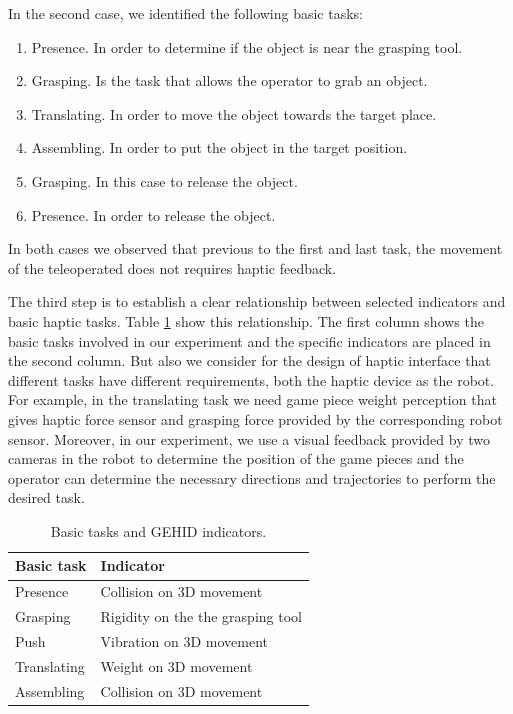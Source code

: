 \documentclass[journal,twoside]{JoPhA}
\begin{document}
In the second case, we identified the following basic tasks:
\begin{enumerate}
\item Presence. In order to determine if the object is near the grasping tool.
\item Grasping. Is the task that allows the operator to grab an object.
\item Translating. In order to move the object towards the target place.
\item Assembling. In order to put the object in the target position.
\item Grasping. In this case to release the object.
\item Presence. In order to release the object.
\end{enumerate}

In both cases we observed that previous to the first and last task, the movement of the teleoperated does not requires haptic feedback.

The third step is to establish a clear relationship between selected indicators and basic haptic tasks. Table \ref{indicators} show this relationship. The first column shows the basic tasks involved in our  experiment and the specific indicators are placed in the second column. But also we consider for the design of haptic interface that different tasks have different requirements, both the haptic device as the robot. For example, in the translating task we need game piece weight perception that gives haptic force sensor and grasping force provided by the corresponding robot sensor. Moreover, in our experiment, we use a visual feedback provided by two cameras in the robot to determine the position of the game pieces and the operator can determine the necessary directions and trajectories to perform the desired task. 

\begin{table}[h]
\centering
\caption{\label{indicators}Basic tasks and GEHID indicators.}
\begin{tabular}{ll}
\hline 
\textbf{\footnotesize{}Basic task} & \textbf{\footnotesize{}Indicator}\tabularnewline
\hline 
{\footnotesize{}Presence} & {\footnotesize{}Collision on 3D movement}\tabularnewline
{\footnotesize{}Grasping} & {\footnotesize{}Rigidity on the the grasping tool}\tabularnewline
{\footnotesize{}Push} & {\footnotesize{}Vibration on 3D movement}\tabularnewline
{\footnotesize{}Translating} & {\footnotesize{}Weight on 3D movement}\tabularnewline
{\footnotesize{}Assembling} & {\footnotesize{}Collision on 3D movement}\tabularnewline
\hline 
\end{tabular}

\end{table}
\end{document}
